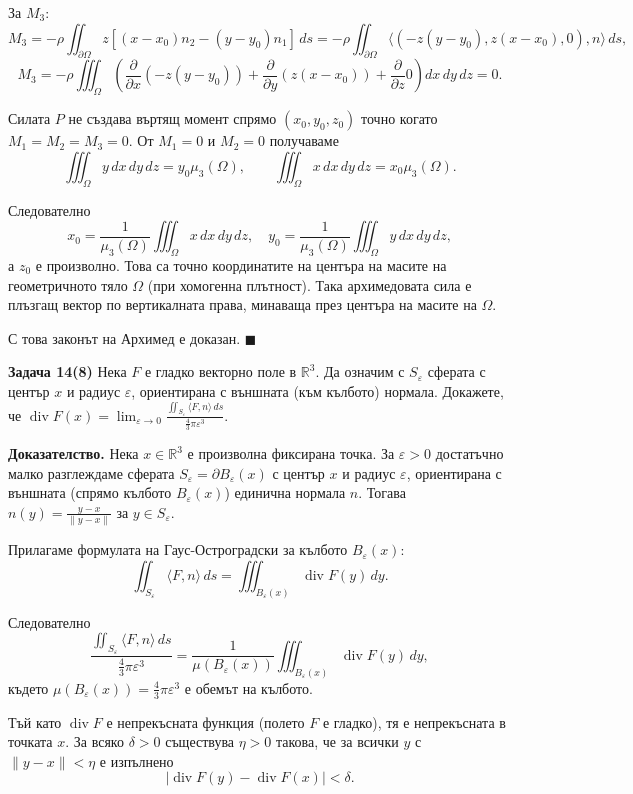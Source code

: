\documentclass[10pt]{article}
\begin{document}
За $M_3$:
\[
M_3 = -\rho \iint_{\partial\Omega} z[(x-x_0)n_2 - (y-y_0)n_1] \, ds = -\rho \iint_{\partial\Omega} \langle (-z(y-y_0), z(x-x_0), 0), n \rangle \, ds,
\]
\[
M_3 = -\rho \iiint_{\Omega} \left( \frac{\partial}{\partial x}(-z(y-y_0)) + \frac{\partial}{\partial y}(z(x-x_0)) + \frac{\partial}{\partial z}0 \right) dx\,dy\,dz = 0.
\]

Силата $P$ не създава въртящ момент спрямо $(x_0,y_0,z_0)$ точно когато $M_1 = M_2 = M_3 = 0$. От $M_1 = 0$ и $M_2 = 0$ получаваме
\[
\iiint_{\Omega} y \, dx\,dy\,dz = y_0 \mu_3(\Omega), \qquad
\iiint_{\Omega} x \, dx\,dy\,dz = x_0 \mu_3(\Omega).
\]

Следователно
\[
x_0 = \frac{1}{\mu_3(\Omega)} \iiint_{\Omega} x \, dx\,dy\,dz, \quad
y_0 = \frac{1}{\mu_3(\Omega)} \iiint_{\Omega} y \, dx\,dy\,dz,
\]
а $z_0$ е произволно. Това са точно координатите на центъра на масите на геометричното тяло $\Omega$ (при хомогенна плътност). Така архимедовата сила е плъзгащ вектор по вертикалната права, минаваща през центъра на масите на $\Omega$.

С това законът на Архимед е доказан. $\blacksquare$


\textbf{Задача 14(8) }Нека $F$ е гладко векторно поле в $\mathbb{R}^3$. Да означим с $S_\varepsilon$ сферата с център $x$ и радиус $\varepsilon$, ориентирана с външната (към кълбото) нормала. Докажете, че $\operatorname{div} F(x) = \displaystyle \lim_{\varepsilon\to 0} \frac{\iint_{S_\varepsilon} \langle F, n\rangle \,ds}{\frac{4}{3}\pi \varepsilon^3}$.

\textbf{Доказателство.} 
Нека $x \in \mathbb{R}^3$ е произволна фиксирана точка. За $\varepsilon > 0$ достатъчно малко разглеждаме сферата $S_\varepsilon = \partial B_\varepsilon(x)$ с център $x$ и радиус $\varepsilon$, ориентирана с външната (спрямо кълбото $B_\varepsilon(x)$) единична нормала $n$. Тогава $n(y) = \frac{y-x}{\|y-x\|}$ за $y \in S_\varepsilon$.

Прилагаме формулата на Гаус-Остроградски за кълбото $B_\varepsilon(x)$:
\[
\iint_{S_\varepsilon} \langle F, n \rangle \,ds = \iiint_{B_\varepsilon(x)} \operatorname{div} F(y) \,dy.
\]

Следователно
\[
\frac{\iint_{S_\varepsilon} \langle F, n\rangle \,ds}{\frac{4}{3}\pi \varepsilon^3} = \frac{1}{\mu(B_\varepsilon(x))} \iiint_{B_\varepsilon(x)} \operatorname{div} F(y) \,dy,
\]
където $\mu(B_\varepsilon(x)) = \frac{4}{3}\pi \varepsilon^3$ е обемът на кълбото.

Тъй като $\operatorname{div} F$ е непрекъсната функция (полето $F$ е гладко), тя е непрекъсната в точката $x$. За всяко $\delta > 0$ съществува $\eta > 0$ такова, че за всички $y$ с $\|y-x\| < \eta$ е изпълнено
\[
|\operatorname{div} F(y) - \operatorname{div} F(x)| < \delta.
\]
\end{document}
